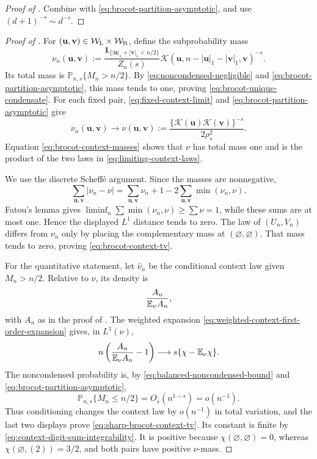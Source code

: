 \begin{proof}[Proof of ]
Combine  with
\eqref{eq:brocot-partition-asymptotic}, and use
\((d+1)^{-s}\sim d^{-s}\).
\end{proof}

\begin{proof}[Proof of ]
For \((\mathbf u,\mathbf v)\in
\mathcal W_{\rm L}\times\mathcal W_{\rm R}\), define the subprobability
mass
\[
 \nu_n(\mathbf u,\mathbf v):=
 \frac{\mathbf1_{\{|\mathbf u|_1+|\mathbf v|_1<n/2\}}}{Z_n(s)}
 \mathcal K(\mathbf u,
 n-|\mathbf u|_1-|\mathbf v|_1,\mathbf v)^{-s}.
\]
Its total mass is \(\mathbb P_{n,s}\{M_n>n/2\}\).  By
\eqref{eq:noncondensed-negligible} and
\eqref{eq:brocot-partition-asymptotic}, this mass tends to one, proving
\eqref{eq:brocot-unique-condensate}.  For each fixed pair,
\eqref{eq:fixed-context-limit} and
\eqref{eq:brocot-partition-asymptotic} give
\[
 \nu_n(\mathbf u,\mathbf v)\longrightarrow
 \nu(\mathbf u,\mathbf v):=
 \frac{\{\mathcal K(\mathbf u)\mathcal K(\mathbf v)\}^{-s}}
      {2\rho_s^2}.
\]
Equation \eqref{eq:brocot-context-masses} shows that \(\nu\) has total mass
one and is the product of the two laws in
\eqref{eq:limiting-context-laws}.

We use the discrete Scheff\'e argument.  Since the masses are nonnegative,
\[
 \sum_{\mathbf u,\mathbf v}|\nu_n-\nu|
 =\sum_{\mathbf u,\mathbf v}\nu_n+1
  -2\sum_{\mathbf u,\mathbf v}\min(\nu_n,\nu).
\]
Fatou's lemma gives
\(\liminf_n\sum\min(\nu_n,\nu)\ge\sum\nu=1\), while these sums are at most
one.  Hence the displayed \(L^1\) distance tends to zero.  The law of
 \((U_n,V_n)\) differs from \(\nu_n\) only by placing the complementary
 mass at \((\varnothing,\varnothing)\).  That mass tends to zero, proving
 \eqref{eq:brocot-context-tv}.

For the quantitative statement, let \(\widehat\nu_n\) be the conditional
context law given \(M_n>n/2\).  Relative to \(\nu\), its density is
\[
 \frac{A_n}{\mathbb{E}_\nu A_n},
\]
with \(A_n\) as in the proof of
.  The weighted expansion
\eqref{eq:weighted-context-first-order-expansion} gives, in
\(L^1(\nu)\),
\[
 n\left(\frac{A_n}{\mathbb{E}_\nu A_n}-1\right)
 \longrightarrow s\{\chi-\mathbb{E}_\nu\chi\}.
\]
The noncondensed probability is, by
\eqref{eq:balanced-noncondensed-bound} and
\eqref{eq:brocot-partition-asymptotic},
\[
 \mathbb P_{n,s}\{M_n\le n/2\}=O_s(n^{1-s})=o(n^{-1}).
\]
Thus conditioning changes the context law by \(o(n^{-1})\) in total
variation, and the last two displays prove
\eqref{eq:sharp-brocot-context-tv}.  Its constant is finite by
\eqref{eq:context-digit-sum-integrability}.  It is positive because
\(\chi(\varnothing,\varnothing)=0\), whereas
\(\chi(\varnothing,(2))=3/2\), and both pairs have positive \(\nu\)-mass.


\end{proof}
